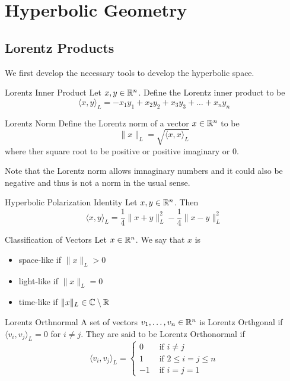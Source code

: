 \documentclass[a4paper]{article}
\begin{document}
\pagebreak
\section{Hyperbolic Geometry}
\subsection{Lorentz Products}
We first develop the necessary tools to develop the hyperbolic space. 
\begin{defn}{Lorentz Inner Product}{} Let $x,y\in\mathbb{R}^n$. Define the Lorentz inner product to be $$\langle x,y\rangle_L=-x_1y_1+x_2y_2+x_3y_3+\dots+x_ny_n$$
\end{defn}

\begin{defn}{Lorentz Norm}{} Define the Lorentz norm of a vector $x\in\mathbb{R}^n$ to be $$\|x\|_L=\sqrt{\langle x,x\rangle_L}$$ where ther square root to be positive or positive imaginary or $0$. 
\end{defn}

Note that the Lorentz norm allows imnaginary numbers and it could also be negative and thus is not a norm in the usual sense. 

\begin{prp}{Hyperbolic Polarization Identity}{} Let $x,y\in\mathbb{R}^n$. Then $$\langle x,y\rangle_L=\frac{1}{4}\|x+y\|_L^2-\frac{1}{4}\|x-y\|_L^2$$
\end{prp}

\begin{defn}{Classification of Vectors}{} Let $x\in\mathbb{R}^n$. We say that $x$ is 
\begin{itemize}
\item space-like if $\|x\|_L>0$
\item light-like if $\|x\|_L=0$
\item time-like if $\|x\|_L\in\mathbb{C}\setminus\mathbb{R}$
\end{itemize}
\end{defn}

\begin{defn}{Lorentz Orthnormal}{} A set of vectors $v_1,\dots,v_n\in\mathbb{R}^n$ is Lorentz Orthgonal if $\langle v_i,v_j\rangle_L=0$ for $i\neq j$. They are said to be Lorentz Orthonormal if $$\langle v_i,v_j\rangle_L=\begin{cases}
0 & \text{ if }i\neq j\\
1 & \text{ if }2\leq i=j\leq n\\
-1 & \text{ if }i=j=1
\end{cases}$$
\end{defn}
\end{document}
